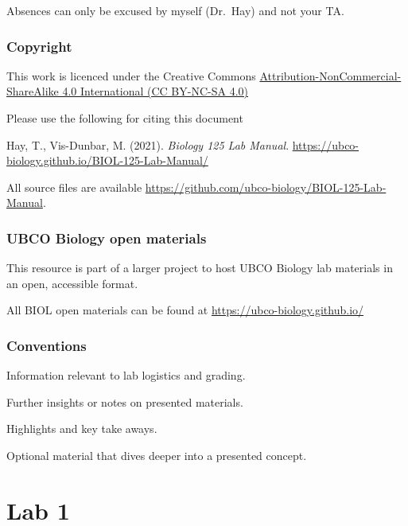 \documentclass[
]{book}
\begin{document}
Absences can only be excused by myself (Dr.~Hay) and not your TA.

\hypertarget{copyright}{%
\section*{Copyright}\label{copyright}}

This work is licenced under the Creative Commons \href{https://creativecommons.org/licenses/by-nc-sa/4.0/}{Attribution-NonCommercial-ShareAlike 4.0 International (CC BY-NC-SA 4.0)}

Please use the following for citing this document

Hay, T., Vis-Dunbar, M. (2021). \emph{Biology 125 Lab Manual}. \url{https://ubco-biology.github.io/BIOL-125-Lab-Manual/}

All source files are available \url{https://github.com/ubco-biology/BIOL-125-Lab-Manual}.

\hypertarget{ubco-biology-open-materials}{%
\section*{UBCO Biology open materials}\label{ubco-biology-open-materials}}

This resource is part of a larger project to host UBCO Biology lab materials in an open, accessible format.

All BIOL open materials can be found at \url{https://ubco-biology.github.io/}

\hypertarget{conventions}{%
\section*{Conventions}\label{conventions}}

Information relevant to lab logistics and grading.

Further insights or notes on presented materials.

Highlights and key take aways.

Optional material that dives deeper into a presented concept.

\hypertarget{part-lab-1}{%
\part*{Lab 1}\label{part-lab-1}}
\end{document}
